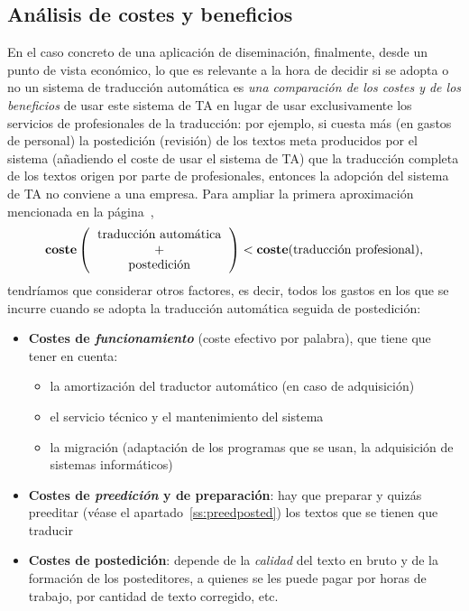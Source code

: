\subsection{Análisis de costes y beneficios} \label{ss:costdetall} En el caso concreto de una aplicación de diseminación, finalmente, desde un punto de vista económico, lo que es relevante a la hora de decidir si se adopta o no un sistema de traducción automática es \emph{una comparación de los costes y de los beneficios} de usar este sistema de TA en lugar de usar exclusivamente los servicios de profesionales de la traducción: por ejemplo, si cuesta más (en gastos de personal) la postedición (revisión) de los textos meta producidos por el sistema (añadiendo el coste de usar el sistema de TA) que la traducción completa de los textos origen por parte de profesionales, entonces la adopción del sistema de TA no conviene a una empresa. Para ampliar la primera aproximación mencionada en la página~\pageref{pg:cost}, $$\textbf{coste}\left(\mbox{\begin{tabular}{c}traducción automática\\ +\\ postedición\end{tabular}}\right) < \textbf{coste}(\mbox{traducción profesional}), $$ tendríamos que considerar otros factores, es decir, todos los gastos en los que se incurre cuando se adopta la traducción automática seguida de postedición: \begin{itemize} \item \textbf{Costes de \emph{funcionamiento}} (coste efectivo por palabra), que tiene que tener en cuenta: \begin{itemize} \item la amortización del traductor automático (en caso de adquisición) \item el servicio técnico y el mantenimiento del sistema \item la migración (adaptación de los programas que se usan, la adquisición de sistemas informáticos) \end{itemize} 

\item \textbf{Costes de \emph{preedición} y de preparación}: hay que preparar y quizás preeditar (véase el apartado~\ref{ss:preedposted}) los textos que se tienen que traducir 

\item \textbf{Costes de postedición}: depende de la \emph{calidad} del texto en bruto y de la formación de los posteditores, a quienes se les puede pagar por horas de trabajo, por cantidad de texto corregido, etc. 


\end{itemize}
